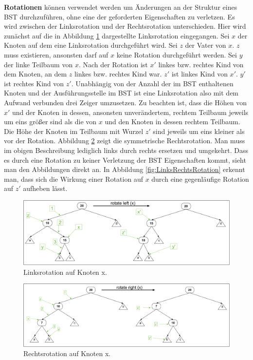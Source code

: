 \documentclass[a4paper,12pt]{article}
\begin{document}
\noindent\textbf{Rotationen} können verwendet werden um Änderungen an der Struktur eines BST durchzuführen, ohne eine der geforderten Eigenschaften zu verletzen. Es wird zwischen der Linksrotation und der Rechtsrotation 
unterschieden. Hier wird zunächst auf die in Abbildung \ref{fig:Linksrotation} dargestellte Linksrotation eingegangen. 
Sei $x$ der Knoten auf dem eine Linksrotation durchgeführt wird. Sei $z$ der Vater von $x$. $z$ muss existieren, ansonsten darf auf $x$ keine Rotation durchgeführt werden. Sei $y$ der linke Teilbaum von $x$. Nach der Rotation ist $x'$ linkes bzw. rechtes Kind von dem Knoten, an dem $z$ linkes bzw. rechtes Kind war. $z'$ ist linkes Kind von $x'$. $y'$ ist rechtes Kind von $z'$. Unabhängig von der Anzahl der im BST enthaltenen Knoten und der Ausführungsstelle im BST ist eine Linksrotation also mit dem Aufwand verbunden drei Zeiger umzusetzen. Zu beachten ist, dass die Höhen von $x'$ und der Knoten in dessen, ansonsten unverändertem, rechtem Teilbaum jeweils um eins größer sind als die von $x$ und den Knoten in dessen rechtem Teilbaum. Die Höhe der Knoten im Teilbaum mit Wurzel $z'$ sind jeweils um eins kleiner als vor der Rotation.
Abbildung \ref{fig:Rechtsrotation} zeigt die symmetrische Rechtsrotation. Man muss im obigen Beschreibung lediglich links durch rechts ersetzen und umgekehrt. Dass es durch eine Rotation zu keiner Verletzung der BST Eigenschaften kommt, sieht man den Abbildungen direkt an. In Abbildung \ref{fig:LinksRechtsRotation} erkennt man, dass sich die Wirkung einer Rotation auf $x$ durch eine gegenläufige Rotation auf $z'$ aufheben lässt.  
\begin{figure}[h]
	\centering
	\includegraphics[width= 1.2\textwidth]{"Medien/Einleitung/Linksrotation"}
	\caption{Linksrotation auf Knoten x. }
	\label{fig:Linksrotation}
\end{figure}
\begin{figure}[h]
	\centering
	\includegraphics[width= 1.2\textwidth]{"Medien/Einleitung/Rechtsrotation"}
	\caption{Rechtsrotation auf Knoten x. }
	\label{fig:Rechtsrotation}
\end{figure}
\end{document}
